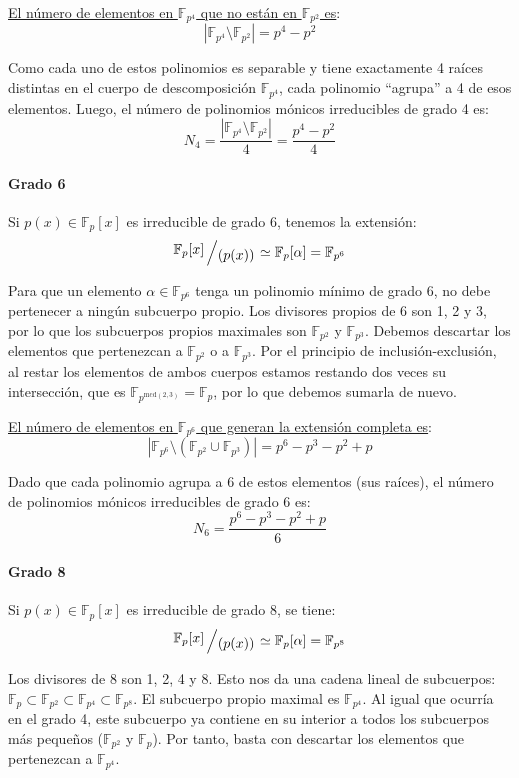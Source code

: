 \begin{enumerate}
\begin{dem}
\underline{El número de elementos en $\mathbb{F}_{p^4}$ que no están en $\mathbb{F}_{p^2}$ es}:
\[ |\mathbb{F}_{p^4} \setminus \mathbb{F}_{p^2}| = p^4 - p^2 \]

Como cada uno de estos polinomios es separable y tiene exactamente 4 raíces distintas en el cuerpo de descomposición $\mathbb{F}_{p^4}$, cada polinomio ``agrupa'' a 4 de esos elementos.
Luego, el número de polinomios mónicos irreducibles de grado 4 es:
\[ N_4 = \frac{|\mathbb{F}_{p^4} \setminus \mathbb{F}_{p^2}|}{4} = \frac{p^4 - p^2}{4} \]


\paragraph{Grado 6}
Si $p(x) \in \mathbb{F}_p[x]$ es irreducible de grado 6, tenemos la extensión:
\[ \modulo{\mathbb{F}_p[x]}{(p(x))} \simeq \mathbb{F}_p[\alpha] = \mathbb{F}_{p^6} \]

Para que un elemento $\alpha \in \mathbb{F}_{p^6}$ tenga un polinomio mínimo de grado 6, no debe pertenecer a ningún subcuerpo propio. Los divisores propios de 6 son 1, 2 y 3, por lo que los subcuerpos propios maximales son $\mathbb{F}_{p^2}$ y $\mathbb{F}_{p^3}$. 
Debemos descartar los elementos que pertenezcan a $\mathbb{F}_{p^2}$ o a $\mathbb{F}_{p^3}$. Por el principio de inclusión-exclusión, al restar los elementos de ambos cuerpos estamos restando dos veces su intersección, que es $\mathbb{F}_{p^{\text{mcd}(2,3)}} = \mathbb{F}_p$, por lo que debemos sumarla de nuevo.

\underline{El número de elementos en $\mathbb{F}_{p^6}$ que generan la extensión completa es}:
\[ |\mathbb{F}_{p^6} \setminus (\mathbb{F}_{p^2} \cup \mathbb{F}_{p^3})| = p^6 - p^3 - p^2 + p \]

Dado que cada polinomio agrupa a 6 de estos elementos (sus raíces), el número de polinomios mónicos irreducibles de grado 6 es:
\[ N_6 = \frac{p^6 - p^3 - p^2 + p}{6} \]


\paragraph{Grado 8}
Si $p(x) \in \mathbb{F}_p[x]$ es irreducible de grado 8, se tiene:
\[ \modulo{\mathbb{F}_p[x]}{(p(x))} \simeq \mathbb{F}_p[\alpha] = \mathbb{F}_{p^8} \]

Los divisores de 8 son 1, 2, 4 y 8. Esto nos da una cadena lineal de subcuerpos: $\mathbb{F}_p \subset \mathbb{F}_{p^2} \subset \mathbb{F}_{p^4} \subset \mathbb{F}_{p^8}$. 
El subcuerpo propio maximal es $\mathbb{F}_{p^4}$. Al igual que ocurría en el grado 4, este subcuerpo ya contiene en su interior a todos los subcuerpos más pequeños ($\mathbb{F}_{p^2}$ y $\mathbb{F}_p$). Por tanto, basta con descartar los elementos que pertenezcan a $\mathbb{F}_{p^4}$.


\end{dem}
\end{enumerate}
